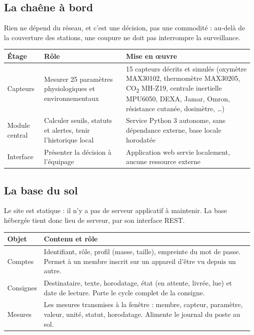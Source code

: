 \documentclass[11pt,a4paper]{article}
\begin{document}
\subsection{La cha\^ene \`a bord}

Rien ne d\'epend du r\'eseau, et c'est une d\'ecision, pas une commodit\'e : au-del\`a de la
couverture des stations, une coupure ne doit pas interrompre la surveillance.

\begin{center}
\begin{tabular}{@{}L{3.4cm} L{4.0cm} L{4.0cm}@{}}
\toprule
\textbf{\'Etage} & \textbf{R\^ole} & \textbf{Mise en \oe{}uvre} \\
\midrule
Capteurs & Mesurer 25 param\`etres physiologiques et environnementaux & 15 capteurs d\'ecrits et simul\'es (oxym\`etre MAX30102, thermom\`etre MAX30205, CO\textsubscript{2} MH-Z19, centrale inertielle MPU6050, DEXA, Jamar, Omron, r\'esistance cutan\'ee, dosim\`etre, \dots) \\
Module central & Calculer seuils, statuts et alertes, tenir l'historique local & Service Python 3 autonome, sans d\'ependance externe, base locale horodat\'ee \\
Interface & Pr\'esenter la d\'ecision \`a l'\'equipage & Application web servie localement, aucune ressource externe \\
\bottomrule
\end{tabular}
\end{center}

\subsection{La base du sol}

Le site est statique : il n'y a pas de serveur applicatif \`a maintenir. La base h\'eberg\'ee tient
donc lieu de serveur, par son interface REST.

\begin{tabularx}{\textwidth}{@{}L{4.3cm} X@{}}
\toprule
\textbf{Objet} & \textbf{Contenu et r\^ole} \\
\midrule
Comptes & Identifiant, r\^ole, profil (masse, taille), empreinte du mot de passe. Permet \`a un membre inscrit sur un appareil d'\^etre vu depuis un autre. \\
Consignes & Destinataire, texte, horodatage, \'etat (en attente, livr\'ee, lue) et date de lecture. Porte le cycle complet de la consigne. \\
Mesures & Les mesures transmises \`a la fen\^etre : membre, capteur, param\`etre, valeur, unit\'e, statut, horodatage. Alimente le journal du poste au sol. \\
\bottomrule
\end{tabularx}
\end{document}
